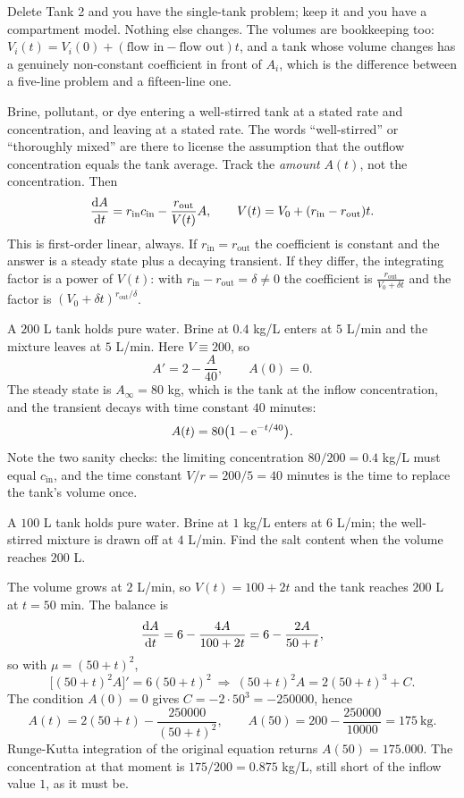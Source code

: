 Delete Tank 2 and you have the single-tank problem; keep it and you have a compartment model. Nothing else changes. The volumes are bookkeeping too: $V_i(t)=V_i(0)+(\text{flow in}-\text{flow out})t$, and a tank whose volume changes has a genuinely non-constant coefficient in front of $A_i$, which is the difference between a five-line problem and a fifteen-line one.

\cue Brine, pollutant, or dye entering a well-stirred tank at a stated rate and concentration, and leaving at a stated rate. The words ``well-stirred'' or ``thoroughly mixed'' are there to license the assumption that the outflow concentration equals the tank average.
\method Track the \emph{amount} $A(t)$, not the concentration. Then
\[\frac{\mathrm{d}A}{\mathrm{d}t}=r_{\text{in}}c_{\text{in}}-\frac{r_{\text{out}}}{V(t)}A,\qquad V(t)=V_0+(r_{\text{in}}-r_{\text{out}})t.\]
This is first-order linear, always. If $r_{\text{in}}=r_{\text{out}}$ the coefficient is constant and the answer is a steady state plus a decaying transient. If they differ, the integrating factor is a power of $V(t)$: with $r_{\text{in}}-r_{\text{out}}=\delta\ne0$ the coefficient is $\frac{r_{\text{out}}}{V_0+\delta t}$ and the factor is $(V_0+\delta t)^{r_{\text{out}}/\delta}$.

\begin{worked}
A $200$ L tank holds pure water. Brine at $0.4$ kg/L enters at $5$ L/min and the mixture leaves at $5$ L/min. Here $V\equiv200$, so
\[A'=2-\frac{A}{40},\qquad A(0)=0.\]
The steady state is $A_\infty=80$ kg, which is the tank at the inflow concentration, and the transient decays with time constant $40$ minutes:
\[A(t)=80\bigl(1-\mathrm{e}^{-t/40}\bigr).\]
Note the two sanity checks: the limiting concentration $80/200=0.4$ kg/L must equal $c_{\text{in}}$, and the time constant $V/r=200/5=40$ minutes is the time to replace the tank's volume once.
\end{worked}

\begin{worked}
A $100$ L tank holds pure water. Brine at $1$ kg/L enters at $6$ L/min; the well-stirred mixture is drawn off at $4$ L/min. Find the salt content when the volume reaches $200$ L.

The volume grows at $2$ L/min, so $V(t)=100+2t$ and the tank reaches $200$ L at $t=50$ min. The balance is
\[\frac{\mathrm{d}A}{\mathrm{d}t}=6-\frac{4A}{100+2t}=6-\frac{2A}{50+t},\]
so with $\mu=(50+t)^{2}$,
\[\bigl[(50+t)^{2}A\bigr]'=6(50+t)^{2}\ \Longrightarrow\ (50+t)^{2}A=2(50+t)^{3}+C.\]
The condition $A(0)=0$ gives $C=-2\cdot50^{3}=-250000$, hence
\[A(t)=2(50+t)-\frac{250000}{(50+t)^{2}},\qquad A(50)=200-\frac{250000}{10000}=175\ \text{kg}.\]
Runge-Kutta integration of the original equation returns $A(50)=175.000$. The concentration at that moment is $175/200=0.875$ kg/L, still short of the inflow value $1$, as it must be.
\end{worked}

